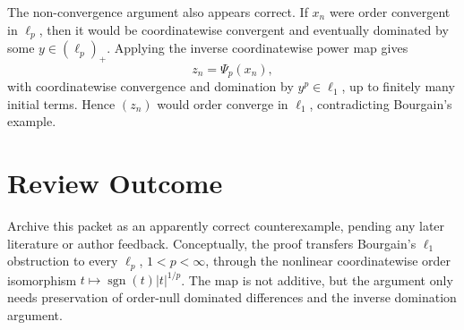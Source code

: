 \documentclass[11pt]{article}
\newcommand{\sgn}{\operatorname{sgn}}
\begin{document}
The non-convergence argument also appears correct. If \(x_n\) were order convergent in \(\ell_p\), then it would be coordinatewise convergent and eventually dominated by some \(y\in(\ell_p)_+\). Applying the inverse coordinatewise power map gives
\[
  z_n=\Psi_p(x_n),
\]
with coordinatewise convergence and domination by \(y^p\in\ell_1\), up to finitely many initial terms. Hence \((z_n)\) would order converge in \(\ell_1\), contradicting Bourgain's example.

\section*{Review Outcome}

Archive this packet as an apparently correct counterexample, pending any later literature or author feedback. Conceptually, the proof transfers Bourgain's \(\ell_1\) obstruction to every \(\ell_p\), \(1<p<\infty\), through the nonlinear coordinatewise order isomorphism \(t\mapsto \sgn(t)|t|^{1/p}\). The map is not additive, but the argument only needs preservation of order-null dominated differences and the inverse domination argument.
\end{document}
